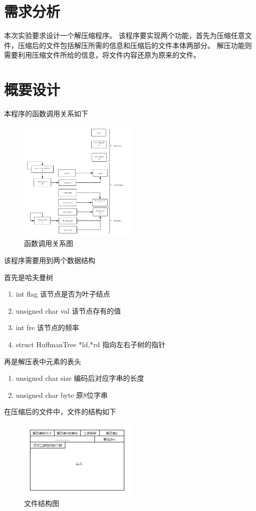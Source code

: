 \section{需求分析}
	本次实验要求设计一个解压缩程序。
	该程序要实现两个功能，首先为压缩任意文件，压缩后的文件包括解压所需的信息和压缩后的文件本体两部分。
	解压功能则需要利用压缩文件所给的信息，将文件内容还原为原来的文件。
\section{概要设计}
	本程序的函数调用关系如下

	\begin{figure}[H]
		\centering
		\includegraphics[width=0.5\textwidth]{images/process.png}
		\caption{函数调用关系图}
	 \end{figure}


	 该程序需要用到两个数据结构


	 首先是哈夫曼树
	 \begin{enumerate}
		 \item int flag 该节点是否为叶子结点
		 \item unsigned char val 该节点存有的值
		 \item int fre 该节点的频率
		 \item struct HuffmanTree *ld,*rd 指向左右子树的指针
	 \end{enumerate}


	 再是解压表中元素的表头
	 \begin{enumerate}
		 \item unsigned char size  编码后对应字串的长度
		 \item unsigned char byte  原8位字串
	 \end{enumerate}


	 在压缩后的文件中，文件的结构如下
	 \begin{figure}[H]
		\centering
		\includegraphics[width=0.5\textwidth]{images/structure.png}
		\caption{文件结构图}
	 \end{figure}


